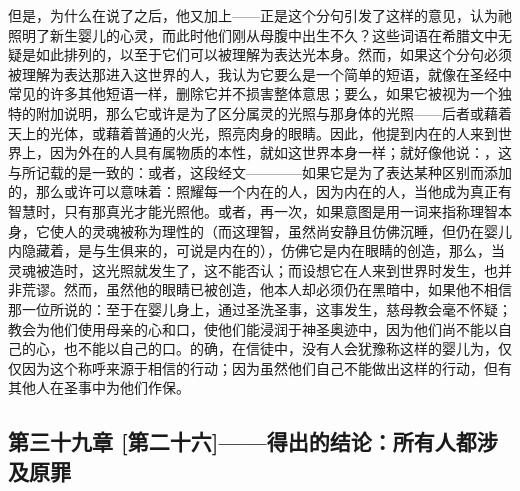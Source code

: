 但是，为什么在说了之后，他又加上——正是这个分句引发了这样的意见，认为祂照明了新生婴儿的心灵，而此时他们刚从母腹中出生不久？这些词语在希腊文中无疑是如此排列的，以至于它们可以被理解为表达光本身。然而，如果这个分句必须被理解为表达那进入这世界的人，我认为它要么是一个简单的短语，就像在圣经中常见的许多其他短语一样，删除它并不损害整体意思；要么，如果它被视为一个独特的附加说明，那么它或许是为了区分属灵的光照与那身体的光照——后者或藉着天上的光体，或藉着普通的火光，照亮肉身的眼睛。因此，他提到内在的人来到世界上，因为外在的人具有属物质的本性，就如这世界本身一样；就好像他说：，这与所记载的是一致的：或者，这段经文————如果它是为了表达某种区别而添加的，那么或许可以意味着：照耀每一个内在的人，因为内在的人，当他成为真正有智慧时，只有那真光才能光照他。或者，再一次，如果意图是用一词来指称理智本身，它使人的灵魂被称为理性的（而这理智，虽然尚安静且仿佛沉睡，但仍在婴儿内隐藏着，是与生俱来的，可说是内在的），仿佛它是内在眼睛的创造，那么，当灵魂被造时，这光照就发生了，这不能否认；而设想它在人来到世界时发生，也并非荒谬。然而，虽然他的眼睛已被创造，他本人却必须仍在黑暗中，如果他不相信那一位所说的：至于在婴儿身上，通过圣洗圣事，这事发生，慈母教会毫不怀疑；教会为他们使用母亲的心和口，使他们能浸润于神圣奥迹中，因为他们尚不能以自己的心，也不能以自己的口。的确，在信徒中，没有人会犹豫称这样的婴儿为，仅仅因为这个称呼来源于相信的行动；因为虽然他们自己不能做出这样的行动，但有其他人在圣事中为他们作保。\par


\subsection{第三十九章 [第二十六]——得出的结论：所有人都涉及原罪}

